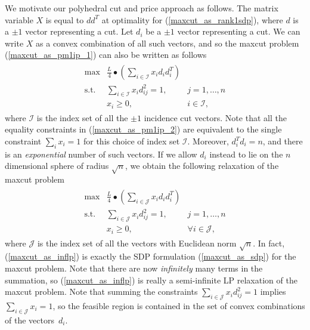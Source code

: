 \documentclass[12pt]{article}
\begin{document}
We motivate our polyhedral cut and price approach as follows. The
matrix variable $X$ is equal to $dd^T$ at optimality for
(\ref{maxcut_as_rank1sdp}), where $d$ is a $\pm 1$ vector
representing a cut. Let $d_i$ be a $\pm 1$ vector representing a
cut. We can write $X$ as a convex combination of all such vectors,
and so the maxcut problem (\ref{maxcut_as_pm1ip_1}) can also be
written as follows
\begin{eqnarray}
\label{maxcut_as_pm1ip_2}
\begin{array}{ccc}
\max & \frac{L}{4} \bullet (\displaystyle \sum_{i \in \mathcal{I}} x_id_id_i^T) \\
\mbox{s.t.} & \displaystyle \sum_{i \in \mathcal{I}} x_i d_{ij}^2
= 1, &
j=1,\ldots,n \\
& x_i \ge 0, & i \in \mathcal{I},
\end{array}
\end{eqnarray}
where $\mathcal{I}$ is the index set of all the $\pm 1$ incidence
cut vectors. Note that all the equality constraints in
(\ref{maxcut_as_pm1ip_2}) are equivalent to the single constraint
$\displaystyle \sum_i x_i = 1$ for this choice of index set
$\mathcal{I}$. Moreover, $d_i^Td_i = n$, and there is an {\em
exponential} number of such vectors. If we allow $d_i$ instead to
lie on the $n$ dimensional sphere of radius $\sqrt{n}$, we obtain
the following relaxation of the maxcut problem
\begin{eqnarray}
\label{maxcut_as_inflp} \begin{array}{ccc} \displaystyle \max &
\frac{L}{4}
\bullet (\displaystyle \sum_{i \in \mathcal{J}} x_i d_id_i^T) \\
\mbox{s.t.} & \displaystyle \sum_{i \in \mathcal{J}} x_i d_{ij}^2
= 1, &
j=1,\ldots,n \\
& x_i \ge 0, & \forall i \in \mathcal{J}, \end{array}
\end{eqnarray} where $\mathcal{J}$ is the index set of all the
vectors with Euclidean norm $\sqrt{n}$. In fact,
(\ref{maxcut_as_inflp}) is exactly the SDP formulation
(\ref{maxcut_as_sdp}) for the maxcut problem. Note that there are
now {\em infinitely} many terms in the summation, so
(\ref{maxcut_as_inflp}) is really a semi-infinite LP relaxation of
the maxcut problem. Note that summing the constraints
$\displaystyle \sum_{i \in \mathcal{J}} x_i d_{ij}^2 = 1$ implies
$\displaystyle \sum_{i \in \mathcal{J}} x_i = 1$, so the feasible
region is contained in the set of convex combinations of the
vectors~$d_i$.
\end{document}
